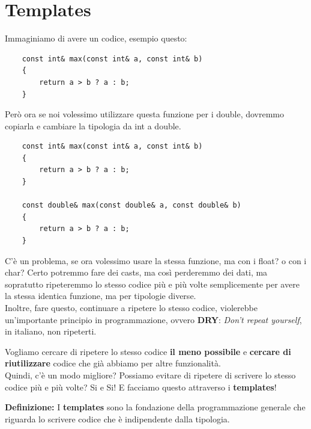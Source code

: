 
\newpage

\section{Templates}

\textsf{\small Immaginiamo di avere un codice, esempio questo:} \\

\begin{lstlisting}
	const int& max(const int& a, const int& b)
	{
		return a > b ? a : b;
	}
\end{lstlisting}

\textsf{\small Però ora se noi volessimo utilizzare questa funzione per i double, dovremmo copiarla e cambiare la tipologia da int a double.} \\

\begin{lstlisting}
	const int& max(const int& a, const int& b)
	{
		return a > b ? a : b;
	}

	const double& max(const double& a, const double& b)
	{
		return a > b ? a : b;
	}
\end{lstlisting}

\textsf{\small C'è un problema, se ora volessimo usare la stessa funzione, ma con i float? o con i char? Certo potremmo fare dei casts, ma così perderemmo dei dati, ma sopratutto ripeteremmo lo stesso codice più e più volte semplicemente per avere la stessa identica funzione, ma per tipologie diverse.} \\

\textsf{\small Inoltre, fare questo, continuare a ripetere lo stesso codice, violerebbe un'importante principio in programmazione, ovvero \textbf{DRY}: \emph{Don't repeat yourself}, in italiano, non ripeterti.} \break 

\textsf{\small Vogliamo cercare di ripetere lo stesso codice \textbf{il meno possibile} e \textbf{cercare di riutilizzare} codice che già abbiamo per altre funzionalità.} \\

\textsf{\small Quindi, c'è un modo migliore? Possiamo evitare di ripetere di scrivere lo stesso codice più e più volte? Si e Si! E facciamo questo attraverso i \textbf{templates}!} \break

\textsf{\small \textbf{Definizione:} I \textbf{templates} sono la fondazione della programmazione generale che riguarda lo scrivere codice che è indipendente dalla tipologia. } \\

